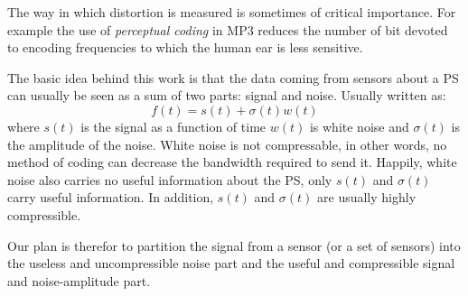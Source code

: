 \documentclass[11pt]{article}
\begin{document}
The way in which distortion is measured is sometimes of critical
importance. For example the use of {\em perceptual coding} in MP3
reduces the number of bit devoted to encoding frequencies to which the
human ear is less sensitive.

The basic idea behind this work is that the data coming from sensors
about a PS can usually be seen as a sum of two parts: signal and
noise. Usually written as:
\[
f(t) = s(t)+\sigma(t) w(t)
\]
where $s(t)$ is the signal as a function of time $w(t)$ is white
noise and $\sigma(t)$ is the amplitude of the noise. White noise is
not compressable, in other words, no method of coding can decrease the
bandwidth required to send it. Happily, white noise also carries no
useful information about the PS, only $s(t)$ and $\sigma(t)$ carry
useful information. In addition, $s(t)$ and $\sigma(t)$ are usually
highly compressible.

Our plan is therefor to partition the signal from a sensor (or a set
of sensors) into the useless and uncompressible noise part and the
useful and compressible signal and noise-amplitude part.




 
\end{document}
